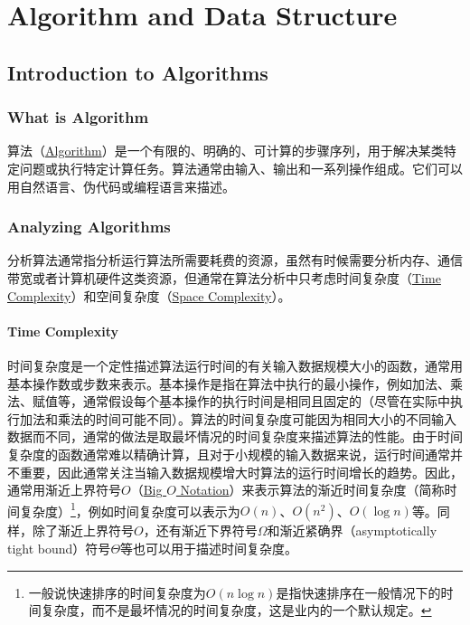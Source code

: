 \part{Algorithm and Data Structure}
\chapter{Introduction to Algorithms}
\section{What is Algorithm}
算法（\href{https://en.wikipedia.org/wiki/Algorithm}{Algorithm}）是一个有限的、明确的、可计算的步骤序列，用于解决某类特定问题或执行特定计算任务\cite{cormenIntroductionAlgorithms2009}。算法通常由输入、输出和一系列操作组成。它们可以用自然语言、伪代码或编程语言来描述。

\section{Analyzing Algorithms}
分析算法通常指分析运行算法所需要耗费的资源，虽然有时候需要分析内存、通信带宽或者计算机硬件这类资源，但通常在算法分析中只考虑时间复杂度（\href{https://www.wikiwand.com/en/articles/Time_complexity}{Time Complexity}）和空间复杂度（\href{https://www.wikiwand.com/en/articles/Space_complexity}{Space Complexity}）。

\subsection{Time Complexity}
时间复杂度是一个定性描述算法运行时间的有关输入数据规模大小的函数，通常用基本操作数或步数来表示。基本操作是指在算法中执行的最小操作，例如加法、乘法、赋值等，通常假设每个基本操作的执行时间是相同且固定的（尽管在实际中执行加法和乘法的时间可能不同）。算法的时间复杂度可能因为相同大小的不同输入数据而不同，通常的做法是取最坏情况的时间复杂度来描述算法的性能。由于时间复杂度的函数通常难以精确计算，且对于小规模的输入数据来说，运行时间通常并不重要，因此通常关注当输入数据规模增大时算法的运行时间增长的趋势。因此，通常用渐近上界符号$O$（\href{https://www.wikiwand.com/en/articles/Big_O_notation}{Big $O$ Notation}）来表示算法的渐近时间复杂度（简称时间复杂度）\footnote{一般说快速排序的时间复杂度为$O(n\log n)$是指快速排序在一般情况下的时间复杂度，而不是最坏情况的时间复杂度，这是业内的一个默认规定。}，例如时间复杂度可以表示为$O(n)$、$O(n^2)$、$O(\log n)$等。同样，除了渐近上界符号$O$，还有渐近下界符号$\Omega$和渐近紧确界（asymptotically tight bound）符号$\Theta$等也可以用于描述时间复杂度\cite{cormenIntroductionAlgorithms2009}。

